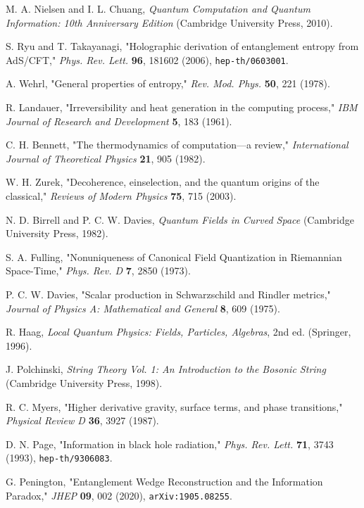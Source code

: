 \documentclass[11pt, letterpaper]{report}
\theoremstyle{plain} %
\theoremstyle{definition} %
\theoremstyle{remark} %
\begin{document}
\begin{thebibliography}{99}
\label{NielsenChuang2010}
M. A. Nielsen and I. L. Chuang, \textit{Quantum Computation and Quantum Information: 10th Anniversary Edition} (Cambridge University Press, 2010).

S. Ryu and T. Takayanagi, "Holographic derivation of entanglement entropy from AdS/CFT," \textit{Phys. Rev. Lett.} \textbf{96}, 181602 (2006), \texttt{hep-th/0603001}.

A. Wehrl, "General properties of entropy," \textit{Rev. Mod. Phys.} \textbf{50}, 221 (1978).

\label{Landauer1961}
R. Landauer, "Irreversibility and heat generation in the computing process," \textit{IBM Journal of Research and Development} \textbf{5}, 183 (1961).

C. H. Bennett, "The thermodynamics of computation—a review," \textit{International Journal of Theoretical Physics} \textbf{21}, 905 (1982).

W. H. Zurek, "Decoherence, einselection, and the quantum origins of the classical," \textit{Reviews of Modern Physics} \textbf{75}, 715 (2003).

N. D. Birrell and P. C. W. Davies, \textit{Quantum Fields in Curved Space} (Cambridge University Press, 1982).

S. A. Fulling, "Nonuniqueness of Canonical Field Quantization in Riemannian Space-Time," \textit{Phys. Rev. D} \textbf{7}, 2850 (1973).

P. C. W. Davies, "Scalar production in Schwarzschild and Rindler metrics," \textit{Journal of Physics A: Mathematical and General} \textbf{8}, 609 (1975).

R. Haag, \textit{Local Quantum Physics: Fields, Particles, Algebras}, 2nd ed. (Springer, 1996).

J. Polchinski, \textit{String Theory Vol. 1: An Introduction to the Bosonic String} (Cambridge University Press, 1998).

R. C. Myers, "Higher derivative gravity, surface terms, and phase transitions," \textit{Physical Review D} \textbf{36}, 3927 (1987).

D. N. Page, "Information in black hole radiation," \textit{Phys. Rev. Lett.} \textbf{71}, 3743 (1993), \texttt{hep-th/9306083}.

G. Penington, "Entanglement Wedge Reconstruction and the Information Paradox," \textit{JHEP} \textbf{09}, 002 (2020), \texttt{arXiv:1905.08255}.


\end{thebibliography}
\end{document}
